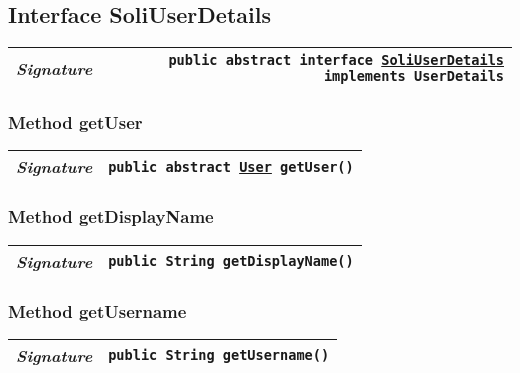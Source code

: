 \begin{adjustwidth}{1.5em}{0pt}
\begin{adjustwidth}{1.5em}{0pt}
\begin{adjustwidth}{1.5em}{0pt}
{\begin{tabularx}{1.0\linewidth}{@{}l R@{}}
      \end{tabularx}}
    \end{adjustwidth}
  \end{adjustwidth}\subsection{Interface SoliUserDetails\label{edu.kit.hci.soli.config.security.SoliUserDetails} }
  \begin{adjustwidth}{1.5em}{0pt}
    {\begin{tabularx}{1.0\linewidth}{@{}l R@{}}
      \emph{Signature} & \texttt{public abstract  interface \texttt{\hyperref[edu.kit.hci.soli.config.security.SoliUserDetails]{\texttt{SoliUserDetails}} implements \texttt{UserDetails}}} \\
      \hline
  
    \end{tabularx}}\subsubsection{Method getUser\label{edu.kit.hci.soli.config.security.SoliUserDetails@getUser()}}
    \begin{adjustwidth}{1.5em}{0pt}
      {\begin{tabularx}{1.0\linewidth}{@{}l R@{}}
        \emph{Signature} & \texttt{public abstract \texttt{\hyperref[edu.kit.hci.soli.domain.User]{\texttt{User}}} getUser()} \\
        \hline
  
      \end{tabularx}}
    \end{adjustwidth}\subsubsection{Method getDisplayName\label{edu.kit.hci.soli.config.security.SoliUserDetails@getDisplayName()}}
    \begin{adjustwidth}{1.5em}{0pt}
      {\begin{tabularx}{1.0\linewidth}{@{}l R@{}}
        \emph{Signature} & \texttt{public \texttt{String} getDisplayName()} \\
        \hline
  
      \end{tabularx}}
    \end{adjustwidth}\subsubsection{Method getUsername\label{edu.kit.hci.soli.config.security.SoliUserDetails@getUsername()}}
    \begin{adjustwidth}{1.5em}{0pt}
      {\begin{tabularx}{1.0\linewidth}{@{}l R@{}}
        \emph{Signature} & \texttt{public \texttt{String} getUsername()} \\
        \hline
  

\end{tabularx}}
\end{adjustwidth}
\end{adjustwidth}
\end{adjustwidth}
